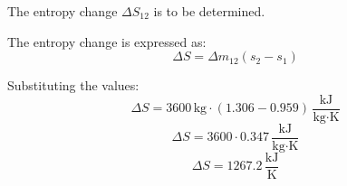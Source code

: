 The entropy change \( \Delta S_{12} \) is to be determined.  

The entropy change is expressed as:  
\[
\Delta S = \Delta m_{12}(s_2 - s_1)
\]  

Substituting the values:  
\[
\Delta S = 3600 \, \text{kg} \cdot (1.306 - 0.959) \, \frac{\text{kJ}}{\text{kg·K}}
\]  
\[
\Delta S = 3600 \cdot 0.347 \, \frac{\text{kJ}}{\text{kg·K}}
\]  
\[
\Delta S = 1267.2 \, \frac{\text{kJ}}{\text{K}}
\]